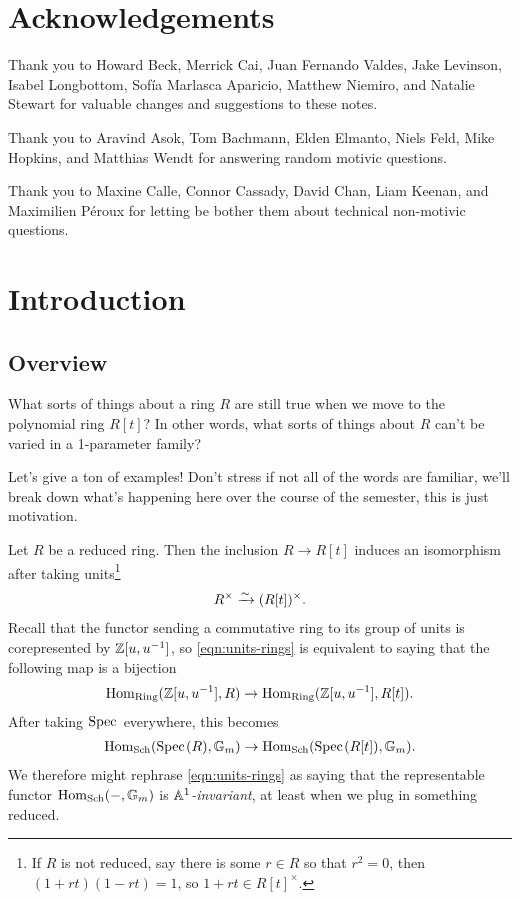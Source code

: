 \documentclass[11pt,openany]{book}
\begin{document}
\section*{Acknowledgements}

Thank you to Howard Beck, Merrick Cai, Juan Fernando Valdes, Jake Levinson, Isabel Longbottom, Sof\'ia Marlasca Aparicio, Matthew Niemiro, and Natalie Stewart for valuable changes and suggestions to these notes.

Thank you to Aravind Asok, Tom Bachmann, Elden Elmanto, Niels Feld, Mike Hopkins, and Matthias Wendt for answering random motivic questions.

Thank you to Maxine Calle, Connor Cassady, David Chan, Liam Keenan, and Maximilien P\'eroux for letting be bother them about technical non-motivic questions.


\section{Introduction}

\subsection{Overview} What sorts of things about a ring $R$ are still true when we move to the polynomial ring $R[t]$? In other words, what sorts of things about $R$ can't be varied in a 1-parameter family?

Let's give a ton of examples! Don't stress if not all of the words are familiar, we'll break down what's happening here over the course of the semester, this is just motivation.

\begin{example} Let $R$ be a reduced ring. Then the inclusion $R \to R[t]$ induces an isomorphism after taking units\footnote{If $R$ is not reduced, say there is some $r\in R$ so that $r^2 = 0$, then $(1+rt)(1-rt) = 1$, so $1+rt\in R[t]^\times$.}
\begin{equation}\label{eqn:units-rings}
\begin{aligned}
    R^\times \xrightarrow{\sim} (R[t])^\times.
\end{aligned}
\end{equation}
Recall that the functor sending a commutative ring to its group of units is corepresented by $\mathbb{Z}[u,u^{-1}]$, so \autoref{eqn:units-rings} is equivalent to saying that the following map is a bijection
\begin{align*}
    \mathrm{Hom}_{\mathrm{Ring}}(\mathbb{Z}[u,u^{-1}],R) \to \mathrm{Hom}_{\mathrm{Ring}}(\mathbb{Z}[u,u^{-1}],R[t]).
\end{align*}
After taking $\text{Spec}\hspace{0.1em}$ everywhere, this becomes
\begin{align*}
    \mathrm{Hom}_{\mathrm{Sch}}(\text{Spec}\hspace{0.1em}(R),\mathbb{G}_m) \to \mathrm{Hom}_{\mathrm{Sch}}(\text{Spec}\hspace{0.1em}(R[t]),\mathbb{G}_m).
\end{align*}
We therefore might rephrase \autoref{eqn:units-rings} as saying that the representable functor $\mathrm{Hom}_{\mathrm{Sch}}(-,\mathbb{G}_m)$ is \textit{$\mathbb{A}^1$-invariant}, at least when we plug in something reduced.
\end{example}
\end{document}

